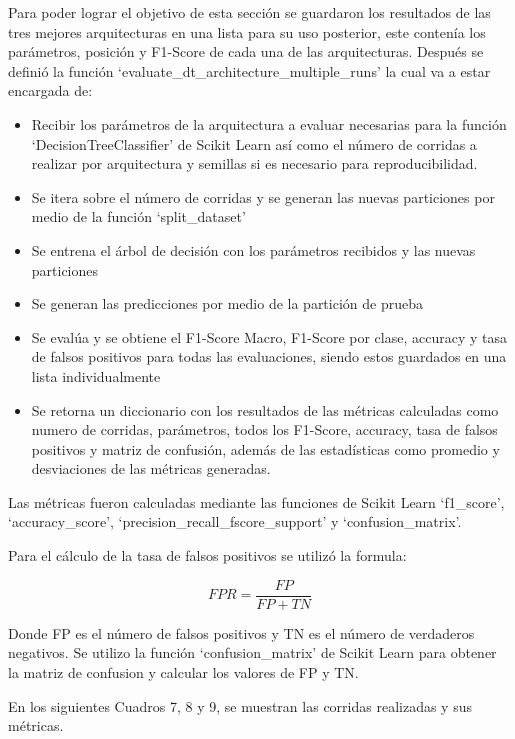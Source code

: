 \documentclass[12pt,a4paper]{article}
\begin{document}
Para poder lograr el objetivo de esta sección se guardaron los resultados de las tres mejores arquitecturas
en una lista para su uso posterior, este contenía los parámetros, posición y F1-Score de cada una de las arquitecturas.
Después se definió la función `evaluate_dt_architecture_multiple_runs' la cual va a estar encargada de:

\begin{itemize}
  \item Recibir los parámetros de la arquitectura a evaluar necesarias para la función `DecisionTreeClassifier' de Scikit Learn
    así como el número de corridas a realizar por arquitectura y semillas si es necesario para reproducibilidad.
  \item Se itera sobre el número de corridas y se generan las nuevas particiones por medio de la función `split_dataset'
  \item Se entrena el árbol de decisión con los parámetros recibidos y las nuevas particiones
  \item Se generan las predicciones por medio de la partición de prueba
  \item Se evalúa y se obtiene el F1-Score Macro, F1-Score por clase, accuracy y
    tasa de falsos positivos para todas las evaluaciones, siendo estos
    guardados en una lista individualmente
  \item Se retorna un diccionario con los resultados de las métricas calculadas como
    numero de corridas, parámetros, todos los F1-Score, accuracy, tasa de falsos positivos y matriz de confusión,
    además de las estadísticas como promedio y desviaciones de las métricas generadas.
\end{itemize}

Las métricas fueron calculadas mediante las funciones de Scikit Learn `f1_score', `accuracy_score', `precision_recall_fscore_support' y `confusion_matrix'.

Para el cálculo de la tasa de falsos positivos se utilizó la formula:

\begin{equation}
  FPR = \frac{FP}{FP + TN}
\end{equation}

Donde FP es el número de falsos positivos y TN es el número de verdaderos negativos.
Se utilizo la función `confusion_matrix' de Scikit Learn para obtener
la matriz de confusion y calcular los valores de FP y TN.

En los siguientes Cuadros 7, 8 y 9, se muestran las corridas realizadas y sus métricas.
\end{document}
